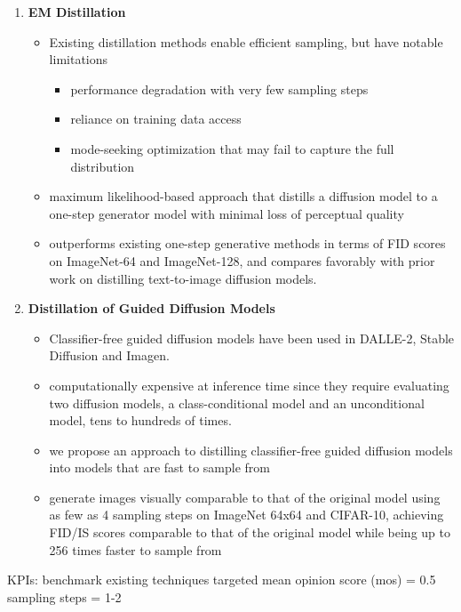 \documentclass[11pt]{article}
\begin{document}
\begin{enumerate}
\item \textbf{EM Distillation} \cite{xie2024emdistillationonestepdiffusion}
\begin{itemize}
    \item Existing distillation methods enable efficient sampling, but have notable limitations
    \begin{itemize}
        \item performance degradation with very few sampling steps
        \item reliance on training data access
        \item mode-seeking optimization that may fail to capture the full distribution
    \end{itemize}
    \item maximum likelihood-based approach that distills a diffusion model to a one-step generator model with minimal loss of perceptual quality
    \item outperforms existing one-step generative methods in terms of FID scores on ImageNet-64 and ImageNet-128, and compares favorably with prior work on distilling text-to-image diffusion models.
\end{itemize}

\item \textbf{Distillation of Guided Diffusion Models}\cite{meng2023distillationguideddiffusionmodels}
\begin{itemize}
    \item Classifier-free guided diffusion models have been used in DALLE-2, Stable Diffusion and Imagen.
    \item computationally expensive at inference time since they require evaluating two diffusion models, a class-conditional model and an unconditional model, tens to hundreds of times. 
    \item we propose an approach to distilling classifier-free guided diffusion models into models that are fast to sample from
    \item generate images visually comparable to that of the original model using as few as 4 sampling steps on ImageNet 64x64 and CIFAR-10, achieving FID/IS scores comparable to that of the original model while being up to 256 times faster to sample from
\end{itemize}

\end{enumerate}

KPIs: benchmark existing techniques
targeted mean opinion score (mos) = 0.5
sampling steps = 1-2






\end{document}
